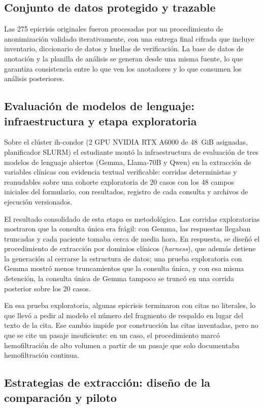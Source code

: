 \documentclass[12pt,letterpaper]{article}
\begin{document}
\subsection{Conjunto de datos protegido y trazable}

Las 275 epicrisis originales fueron procesadas por un procedimiento de anonimización validado iterativamente, con una entrega final cifrada que incluye inventario, diccionario de datos y huellas de verificación. La base de datos de anotación y la planilla de análisis se generan desde una misma fuente, lo que garantiza consistencia entre lo que ven los anotadores y lo que consumen los análisis posteriores.

\subsection{Evaluación de modelos de lenguaje: infraestructura y etapa exploratoria}

Sobre el clúster ih-condor (2 GPU NVIDIA RTX A6000 de 48~GiB asignadas, planificador SLURM) el estudiante montó la infraestructura de evaluación de tres modelos de lenguaje abiertos (Gemma, Llama-70B y Qwen) en la extracción de variables clínicas con evidencia textual verificable: corridas deterministas y reanudables sobre una cohorte exploratoria de 20 casos con los 48 campos iniciales del formulario, con resultados, registro de cada consulta y archivos de ejecución versionados.

El resultado consolidado de esta etapa es metodológico. Las corridas exploratorias mostraron que la consulta única era frágil: con Gemma, las respuestas llegaban truncadas y cada paciente tomaba cerca de media hora. En respuesta, se diseñó el procedimiento de extracción por dominios clínicos (\textit{harness}), que además detiene la generación al cerrarse la estructura de datos; una prueba exploratoria con Gemma mostró menos truncamientos que la consulta única, y con esa misma detención, la consulta única de Gemma tampoco se truncó en una corrida posterior sobre los 20 casos.

En esa prueba exploratoria, algunas epicrisis terminaron con citas no literales, lo que llevó a pedir al modelo el número del fragmento de respaldo en lugar del texto de la cita. Ese cambio impide por construcción las citas inventadas, pero no que se cite un pasaje insuficiente: en un caso, el procedimiento marcó hemofiltración de alto volumen a partir de un pasaje que solo documentaba hemofiltración continua.

\subsection{Estrategias de extracción: diseño de la comparación y piloto}\label{sec:estrategias}
\end{document}
